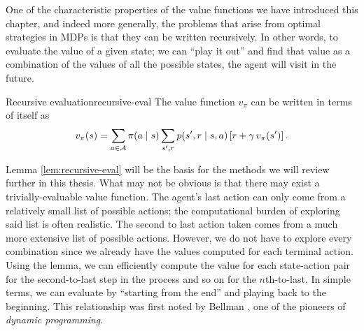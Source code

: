 One of the characteristic properties of the value functions we have introduced
this chapter, and indeed more generally, the problems that arise from optimal
strategies in MDPs is that they can be written recursively. In other words, to
evaluate the value of a given state; we can ``play it out'' and find that value
as a combination of the values of all the possible states, the agent will visit in
the future.

\begin{lemma}{Recursive evaluation}{recursive-eval}
	The value function $v_\pi$ can be written in terms of itself as
	\[
		v_\pi (s) = \sum_{a \in \mathcal{A}} \pi(a \mid s) \sum_{s', r} p(s', r \mid s, a) \left[ r + \gamma \, v_\pi (s') \right].
	\]
\end{lemma}

Lemma \ref{lem:recursive-eval} will be the basis for the methods we will review
further in this thesis. What may not be obvious is that there may exist a
trivially-evaluable value function. The agent's last action can only come from a
relatively small list of possible actions; the computational burden of exploring
said list is often realistic. The second to last action taken comes from a much
more extensive list of possible actions. However, we do not have to explore
every combination since we already have the values computed for each terminal
action.  Using the lemma, we can efficiently compute the value for each
state-action pair for the second-to-last step in the process and so on for the
$n$th-to-last. In simple terms, we can evaluate by ``starting from the end'' and
playing back to the beginning. This relationship was first noted by Bellman
\cite{bellman1957}, one of the pioneers of \textit{dynamic programming}.

